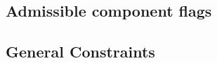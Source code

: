 \subsection{Admissible \rlp{} component flags}       \label{rlp txn v2: generalities: admissible rlp component flags} 
\subsection{General Constraints}                     \label{rlp txn v2: generalities: indices and limb constructed}   
